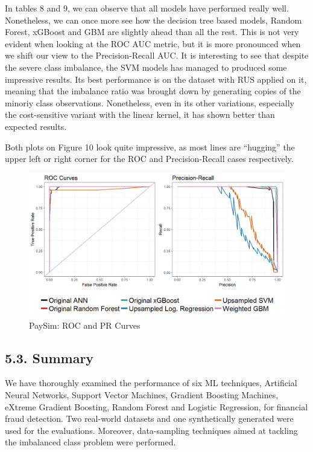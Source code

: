 \documentclass[12pt,]{article}
\begin{document}
In tables 8 and 9, we can observe that all models have performed really
well. Nonetheless, we can once more see how the decision tree based
models, Random Forest, xGBoost and GBM are slightly ahead than all the
rest. This is not very evident when looking at the ROC AUC metric, but
it is more pronounced when we shift our view to the Precision-Recall
AUC. It is interesting to see that despite the severe class imbalance,
the SVM models has managed to produced some impressive results. Its best
performance is on the dataset with RUS applied on it, meaning that the
imbalance ratio was brought down by generating copies of the minoriy
class observations. Nonetheless, even in its other variations,
especially the cost-sensitive variant with the linear kernel, it has
shown better than expected results.

Both plots on Figure 10 look quite impressive, as most lines are
``hugging'' the upper left or right corner for the ROC and
Precision-Recall cases respectively.

\begin{figure}
\centering
\includegraphics[width=1\textwidth,height=\textheight]{figures/paySim/paySim_pr_roc.png}
\caption{PaySim: ROC and PR Curves}
\end{figure}

\hypertarget{summary}{%
\subsection{5.3. Summary}\label{summary}}

We have thoroughly examined the performance of six ML techniques,
Artificial Neural Networks, Support Vector Machines, Gradient Boosting
Machines, eXtreme Gradient Boosting, Random Forest and Logistic
Regression, for financial fraud detection. Two real-world datasets and
one synthetically generated were used for the evaluations. Moreover,
data-sampling techniques aimed at tackling the imbalanced class problem
were performed.
\end{document}
